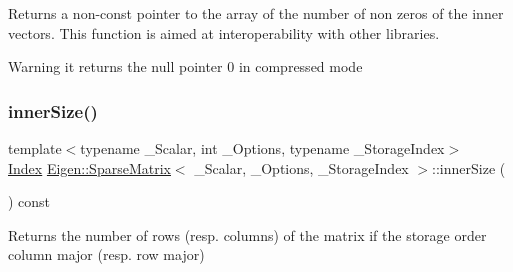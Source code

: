 \begin{DoxyReturn}{Returns}
a non-\/const pointer to the array of the number of non zeros of the inner vectors. This function is aimed at interoperability with other libraries. 
\end{DoxyReturn}
\begin{DoxyWarning}{Warning}
it returns the null pointer 0 in compressed mode 
\end{DoxyWarning}
\mbox{\label{class_eigen_1_1_sparse_matrix_a0f42824d4a06ee1d1f6afbc4551c5896}} 
\subsubsection{\texorpdfstring{innerSize()}{innerSize()}}
{\footnotesize\ttfamily template$<$typename \+\_\+\+Scalar, int \+\_\+\+Options, typename \+\_\+\+Storage\+Index$>$ \\
\mbox{\hyperlink{struct_eigen_1_1_eigen_base_a554f30542cc2316add4b1ea0a492ff02}{Index}} \mbox{\hyperlink{class_eigen_1_1_sparse_matrix}{Eigen\+::\+Sparse\+Matrix}}$<$ \+\_\+\+Scalar, \+\_\+\+Options, \+\_\+\+Storage\+Index $>$\+::inner\+Size (\begin{DoxyParamCaption}{ }\end{DoxyParamCaption}) const\hspace{0.3cm}{\ttfamily [inline]}}

\begin{DoxyReturn}{Returns}
the number of rows (resp. columns) of the matrix if the storage order column major (resp. row major) 
\end{DoxyReturn}
\mbox{\label{class_eigen_1_1_sparse_matrix_aae45e3b5fec7f6a0cdd10eec7c6d3666}} 
